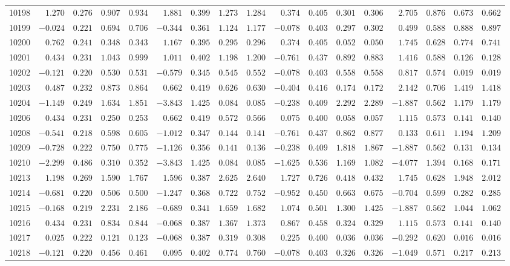 \begin{landscape}
{\begin{longtable}{l|rrrr|rrrr|rrrr|rrrr}
10198&$ 1.270$&$0.276$&$0.907$&$0.934$&$ 1.881$&$0.399$&$1.273$&$1.284$&$ 0.374$&$0.405$&$0.301$&$0.306$&$ 2.705$&$0.876$&$0.673$&$0.662$\tabularnewline
10199&$-0.024$&$0.221$&$0.694$&$0.706$&$-0.344$&$0.361$&$1.124$&$1.177$&$-0.078$&$0.403$&$0.297$&$0.302$&$ 0.499$&$0.588$&$0.888$&$0.897$\tabularnewline
10200&$ 0.762$&$0.241$&$0.348$&$0.343$&$ 1.167$&$0.395$&$0.295$&$0.296$&$ 0.374$&$0.405$&$0.052$&$0.050$&$ 1.745$&$0.628$&$0.774$&$0.741$\tabularnewline
10201&$ 0.434$&$0.231$&$1.043$&$0.999$&$ 1.011$&$0.402$&$1.198$&$1.200$&$-0.761$&$0.437$&$0.892$&$0.883$&$ 1.416$&$0.588$&$0.126$&$0.128$\tabularnewline
10202&$-0.121$&$0.220$&$0.530$&$0.531$&$-0.579$&$0.345$&$0.545$&$0.552$&$-0.078$&$0.403$&$0.558$&$0.558$&$ 0.817$&$0.574$&$0.019$&$0.019$\tabularnewline
10203&$ 0.487$&$0.232$&$0.873$&$0.864$&$ 0.662$&$0.419$&$0.626$&$0.630$&$-0.404$&$0.416$&$0.174$&$0.172$&$ 2.142$&$0.706$&$1.419$&$1.418$\tabularnewline
10204&$-1.149$&$0.249$&$1.634$&$1.851$&$-3.843$&$1.425$&$0.084$&$0.085$&$-0.238$&$0.409$&$2.292$&$2.289$&$-1.887$&$0.562$&$1.179$&$1.179$\tabularnewline
10206&$ 0.434$&$0.231$&$0.250$&$0.253$&$ 0.662$&$0.419$&$0.572$&$0.566$&$ 0.075$&$0.400$&$0.058$&$0.057$&$ 1.115$&$0.573$&$0.141$&$0.140$\tabularnewline
10208&$-0.541$&$0.218$&$0.598$&$0.605$&$-1.012$&$0.347$&$0.144$&$0.141$&$-0.761$&$0.437$&$0.862$&$0.877$&$ 0.133$&$0.611$&$1.194$&$1.209$\tabularnewline
10209&$-0.728$&$0.222$&$0.750$&$0.775$&$-1.126$&$0.356$&$0.141$&$0.136$&$-0.238$&$0.409$&$1.818$&$1.867$&$-1.887$&$0.562$&$0.131$&$0.134$\tabularnewline
10210&$-2.299$&$0.486$&$0.310$&$0.352$&$-3.843$&$1.425$&$0.084$&$0.085$&$-1.625$&$0.536$&$1.169$&$1.082$&$-4.077$&$1.394$&$0.168$&$0.171$\tabularnewline
10213&$ 1.198$&$0.269$&$1.590$&$1.767$&$ 1.596$&$0.387$&$2.625$&$2.640$&$ 1.727$&$0.726$&$0.418$&$0.432$&$ 1.745$&$0.628$&$1.948$&$2.012$\tabularnewline
10214&$-0.681$&$0.220$&$0.506$&$0.500$&$-1.247$&$0.368$&$0.722$&$0.752$&$-0.952$&$0.450$&$0.663$&$0.675$&$-0.704$&$0.599$&$0.282$&$0.285$\tabularnewline
10215&$-0.168$&$0.219$&$2.231$&$2.186$&$-0.689$&$0.341$&$1.659$&$1.682$&$ 1.074$&$0.501$&$1.300$&$1.425$&$-1.887$&$0.562$&$1.044$&$1.062$\tabularnewline
10216&$ 0.434$&$0.231$&$0.834$&$0.844$&$-0.068$&$0.387$&$1.367$&$1.373$&$ 0.867$&$0.458$&$0.324$&$0.329$&$ 1.115$&$0.573$&$0.141$&$0.140$\tabularnewline
10217&$ 0.025$&$0.222$&$0.121$&$0.123$&$-0.068$&$0.387$&$0.319$&$0.308$&$ 0.225$&$0.400$&$0.036$&$0.036$&$-0.292$&$0.620$&$0.016$&$0.016$\tabularnewline
10218&$-0.121$&$0.220$&$0.456$&$0.461$&$ 0.095$&$0.402$&$0.774$&$0.760$&$-0.078$&$0.403$&$0.326$&$0.326$&$-1.049$&$0.571$&$0.217$&$0.213$\tabularnewline

\end{longtable}}
\end{landscape}
